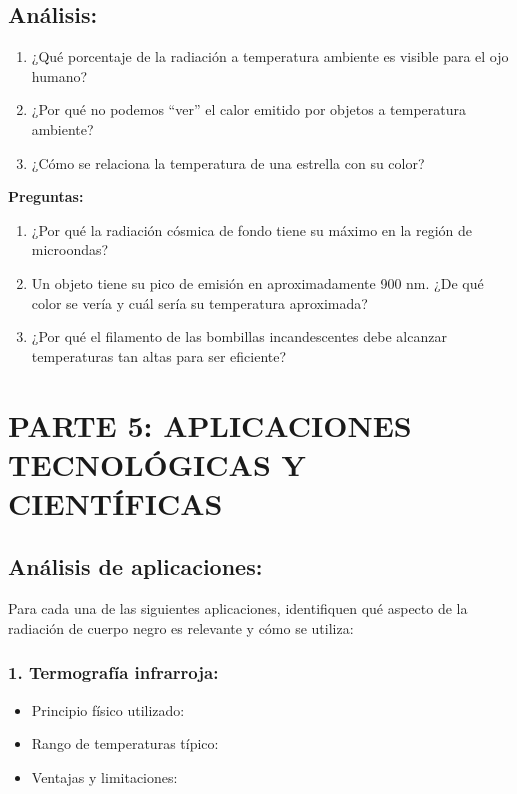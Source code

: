 \documentclass[12pt,a4paper]{article}
\begin{document}
	\subsection{Análisis:}
	\begin{enumerate}
		\item ¿Qué porcentaje de la radiación a temperatura ambiente es visible para el ojo humano?
		\item ¿Por qué no podemos ``ver'' el calor emitido por objetos a temperatura ambiente?
		\item ¿Cómo se relaciona la temperatura de una estrella con su color?
	\end{enumerate}
	
	\begin{preguntabox}
		\textbf{Preguntas:}
		\begin{enumerate}
			\item ¿Por qué la radiación cósmica de fondo tiene su máximo en la región de microondas?
			\item Un objeto tiene su pico de emisión en aproximadamente 900 nm. ¿De qué color se vería y cuál sería su temperatura aproximada?
			\item ¿Por qué el filamento de las bombillas incandescentes debe alcanzar temperaturas tan altas para ser eficiente?
		\end{enumerate}
	\end{preguntabox}
	
	\newpage
	
	\section{PARTE 5: APLICACIONES TECNOLÓGICAS Y CIENTÍFICAS}
	
	\subsection{Análisis de aplicaciones:}
	
	Para cada una de las siguientes aplicaciones, identifiquen qué aspecto de la radiación de cuerpo negro es relevante y cómo se utiliza:
	
	\subsubsection{1. Termografía infrarroja:}
	\begin{itemize}
		\item Principio físico utilizado: \hrulefill
		\item Rango de temperaturas típico: \hrulefill
		\item Ventajas y limitaciones: \hrulefill
	\end{itemize}
	
\end{document}
